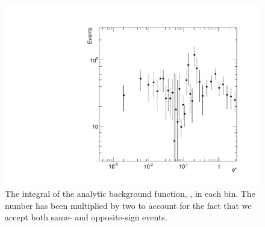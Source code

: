 \begin{figure}[!htbp]
    \centering
    \includegraphics[width=\textwidth]{figures/qcd_phistar.pdf}
    \caption{
        The integral of the analytic background function, \BGFunc, in each
        \phistar bin. The number has been multiplied by two to account for the
        fact that we accept both same- and opposite-sign events.
    }
    \label{fig:qcd_phistar}
\end{figure}

